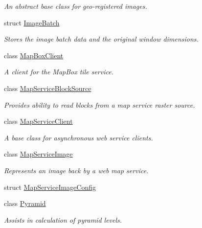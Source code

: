 \begin{DoxyCompactItemize}
\begin{DoxyCompactList}\small\item\em An abstract base class for geo-\/registered images. \end{DoxyCompactList}\item 
struct \hyperlink{structdg_1_1deepcore_1_1imagery_1_1_image_batch}{Image\+Batch}
\begin{DoxyCompactList}\small\item\em Stores the image batch data and the original window dimensions. \end{DoxyCompactList}\item 
class \hyperlink{classdg_1_1deepcore_1_1imagery_1_1_map_box_client}{Map\+Box\+Client}
\begin{DoxyCompactList}\small\item\em A client for the Map\+Box tile service. \end{DoxyCompactList}\item 
class \hyperlink{classdg_1_1deepcore_1_1imagery_1_1_map_service_block_source}{Map\+Service\+Block\+Source}
\begin{DoxyCompactList}\small\item\em Provides ability to read blocks from a map service raster source. \end{DoxyCompactList}\item 
class \hyperlink{classdg_1_1deepcore_1_1imagery_1_1_map_service_client}{Map\+Service\+Client}
\begin{DoxyCompactList}\small\item\em A base class for asynchronous web service clients. \end{DoxyCompactList}\item 
class \hyperlink{classdg_1_1deepcore_1_1imagery_1_1_map_service_image}{Map\+Service\+Image}
\begin{DoxyCompactList}\small\item\em Represents an image back by a web map service. \end{DoxyCompactList}\item 
struct \hyperlink{structdg_1_1deepcore_1_1imagery_1_1_map_service_image_config}{Map\+Service\+Image\+Config}
\item 
class \hyperlink{classdg_1_1deepcore_1_1imagery_1_1_pyramid}{Pyramid}
\begin{DoxyCompactList}\small\item\em Assists in calculation of pyramid levels. \end{DoxyCompactList}\item 

\end{DoxyCompactItemize}
